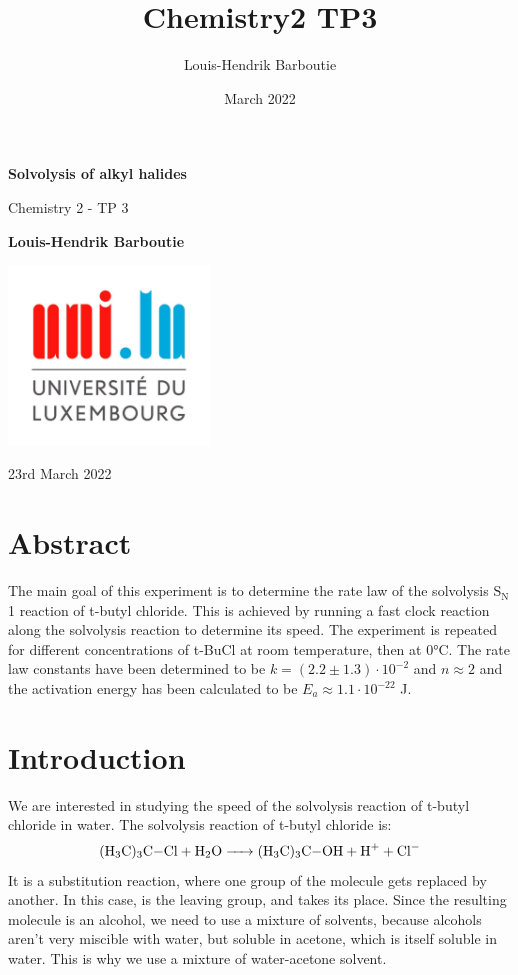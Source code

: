 \documentclass[12pt]{article}
\title{Chemistry2 TP3}
\author{Louis-Hendrik Barboutie}
\date{March 2022}
\begin{document}
\begin{titlepage}
    \begin{center}
        \vspace*{1cm}
        \Huge
        \textbf{Solvolysis  of alkyl halides}
        
        \vspace{0.5cm}
        \LARGE
        Chemistry 2 - TP 3
        
        \vspace{1.5cm}
        \textbf{Louis-Hendrik Barboutie}
        
        \vfill
        

        \includegraphics[width=0.4\textwidth]{logo_uni.jpg}
        
        \Large
        23rd March 2022
    \end{center}
\end{titlepage}

\section{Abstract}
The main goal of this experiment is to determine the rate law of the solvolysis $\text{S}_\text{N}$1 reaction of t-butyl chloride. This is achieved by running a fast clock reaction along the solvolysis reaction to determine its speed. The experiment is repeated for different concentrations of t-BuCl at room temperature, then at 0°C. The rate law constants have been determined to be $k = (2.2\pm1.3)\cdot 10^{-2}$ and $n \approx 2$ and the activation energy has been calculated to be $E_a \approx 1.1 \cdot 10^{-22}$ J. 

\section{Introduction}
We are interested in studying the speed of the solvolysis reaction of t-butyl chloride in water. The solvolysis reaction of t-butyl chloride is: \begin{equation}
    \ce{(H3C)3C-Cl + H2O -> (H3C)3C-OH + H+ + Cl-}
\end{equation} It is a substitution reaction, where one group of the molecule gets replaced by another. In this case,  is the leaving group, and  takes its place. Since the resulting molecule is an alcohol, we need to use a mixture of solvents, because alcohols aren't very miscible with water, but soluble in acetone, which is itself soluble in water. This is why we use a mixture of water-acetone solvent. 
\end{document}
